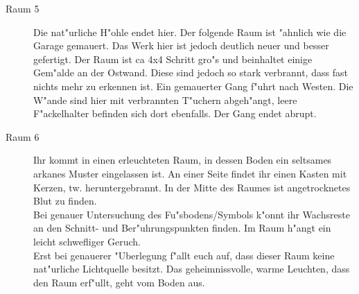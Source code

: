 \begin{description}
\item [Raum 5] Die nat"urliche H"ohle endet hier. Der folgende Raum ist "ahnlich wie die Garage gemauert. Das Werk hier ist jedoch deutlich neuer und besser gefertigt. Der Raum ist ca 4x4 Schritt gro"s und beinhaltet einige Gem"alde an der Ostwand. Diese sind jedoch so stark verbrannt, dass fast nichts mehr zu erkennen ist. Ein gemauerter Gang f"uhrt nach Westen. Die W"ande sind hier mit verbrannten T"uchern abgeh"angt, leere F"ackelhalter befinden sich dort ebenfalls. Der Gang endet abrupt.

\item [Raum 6] Ihr kommt in einen erleuchteten Raum, in dessen Boden ein seltsames arkanes Muster eingelassen ist. An einer Seite findet ihr einen Kasten mit Kerzen, tw. heruntergebrannt. In der Mitte des Raumes ist angetrocknetes Blut zu finden.\\
Bei genauer Untersuchung des Fu"sbodens/Symbols k"onnt ihr Wachsreste an den Schnitt- und Ber"uhrungspunkten finden. Im Raum h"angt ein leicht schwefliger Geruch.\\
Erst bei genauerer "Uberlegung f"allt euch auf, dass dieser Raum keine nat"urliche Lichtquelle besitzt. Das geheimnissvolle, warme Leuchten, dass den Raum erf"ullt, geht vom Boden aus.
\end{description}

